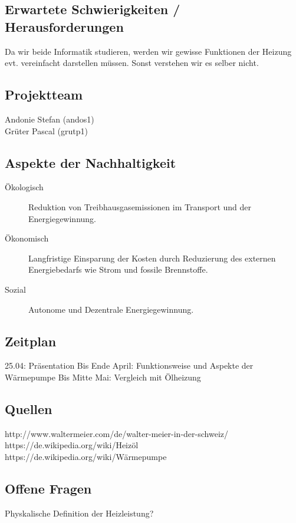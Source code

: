 \documentclass[10pt,paper=a4,final]{scrartcl}
\begin{document}
\subsection*{Erwartete Schwierigkeiten / Herausforderungen}

Da wir beide Informatik studieren, werden wir gewisse Funktionen der Heizung evt. vereinfacht darstellen müssen. Sonst verstehen wir es selber nicht.

\subsection*{Projektteam}

  \begin{description}
    \item[Andonie Stefan (andos1)]
    \item[Grüter Pascal (grutp1)]
  \end{description}

\subsection*{Aspekte der Nachhaltigkeit}

  \begin{description}
    \item[Ökologisch] Reduktion von Treibhausgasemissionen im Transport und
    der Energiegewinnung.
    \item[Ökonomisch] Langfristige Einsparung der Kosten durch Reduzierung des
    externen Energiebedarfs wie Strom und fossile Brennstoffe.
    \item[Sozial] Autonome und Dezentrale Energiegewinnung.
  \end{description}

\subsection*{Zeitplan}

25.04: Präsentation
Bis Ende April: Funktionsweise und Aspekte der Wärmepumpe
Bis Mitte Mai: Vergleich mit Ölheizung

\subsection*{Quellen}

http://www.waltermeier.com/de/walter-meier-in-der-schweiz/ \\
https://de.wikipedia.org/wiki/Heizöl \\
https://de.wikipedia.org/wiki/Wärmepumpe \\

\subsection*{Offene Fragen}

Physkalische Definition der Heizleistung?
\end{document}
